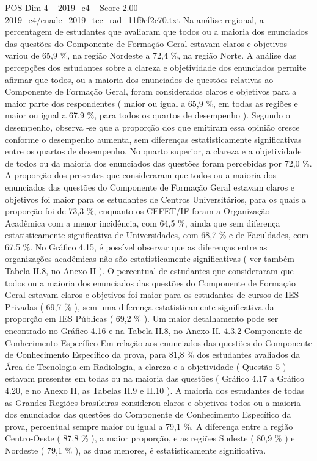 \begin{textsample}{POS Dim 4 – 2019\_c4 – Score 2.00 – 2019\_c4/enade\_2019\_tec\_rad\_11f9cf2c70.txt}
Na análise regional, a percentagem de estudantes que avaliaram que todos ou a maioria dos enunciados das questões do Componente de Formação Geral estavam claros e objetivos variou de 65,9 \%, na região Nordeste a 72,4 \%, na região Norte.
A análise das percepções dos estudantes sobre a clareza e objetividade dos enunciados permite afirmar que todos, ou a maioria dos enunciados de questões relativas ao Componente de Formação Geral, foram considerados claros e objetivos para a maior parte dos respondentes ( maior ou igual a 65,9 \%, em todas as regiões e maior ou igual a 67,9 \%, para todos os quartos de desempenho ).
Segundo o desempenho, observa -se que a proporção dos que emitiram essa opinião cresce conforme o desempenho aumenta, sem diferenças estatisticamente significativas entre os quartos de desempenho.
No quarto superior, a clareza e a objetividade de todos ou da maioria dos enunciados das questões foram percebidas por 72,0 \%.
A proporção dos presentes que consideraram que todos ou a maioria dos enunciados das questões do Componente de Formação Geral estavam claros e objetivos foi maior para os estudantes de Centros Universitários, para os quais a proporção foi de 73,3 \%, enquanto os CEFET/IF foram a Organização Acadêmica com a menor incidência, com 64,5 \%, ainda que sem diferença estatisticamente significativa de Universidades, com 68,7 \% e de Faculdades, com 67,5 \%.
No Gráfico 4.15, é possível observar que as diferenças entre as organizações acadêmicas não são estatisticamente significativas ( ver também Tabela II.8, no Anexo II ).
O percentual de estudantes que consideraram que todos ou a maioria dos enunciados das questões do Componente de Formação Geral estavam claros e objetivos foi maior para os estudantes de cursos de IES Privadas ( 69,7 \% ), sem uma diferença estatisticamente significativa da proporção em IES Públicas ( 69,2 \% ).
Um maior detalhamento pode ser encontrado no Gráfico 4.16 e na Tabela II.8, no Anexo II. 4.3.2 Componente de Conhecimento Específico Em relação aos enunciados das questões do Componente de Conhecimento Específico da prova, para 81,8 \% dos estudantes avaliados da Área de Tecnologia em Radiologia, a clareza e a objetividade ( Questão 5 ) estavam presentes em todas ou na maioria das questões ( Gráfico 4.17 a Gráfico 4.20, e no Anexo II, as Tabelas II.9 e II.10 ).
A maioria dos estudantes de todas as Grandes Regiões brasileiras considerou claros e objetivos todos ou a maioria dos enunciados das questões do Componente de Conhecimento Específico da prova, percentual sempre maior ou igual a 79,1 \%.
A diferença entre a região Centro-Oeste ( 87,8 \% ), a maior proporção, e as regiões Sudeste ( 80,9 \% ) e Nordeste ( 79,1 \% ), as duas menores, é estatisticamente significativa.

\end{textsample}
